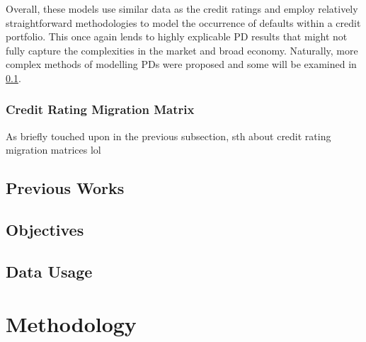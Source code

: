 \documentclass[10pt]{article}
\begin{document}
\begin{multicols*}{2}
Overall, these models use similar data as the credit ratings and employ relatively straightforward methodologies to model the occurrence of defaults within a credit portfolio. This once again lends to highly explicable PD results that might not fully capture the complexities in the market and broad economy.
Naturally, more complex methods of modelling PDs were proposed and some will be examined in \ref{lit-review}.

\subsubsection{Credit Rating Migration Matrix}\label{CRMM}

As briefly touched upon in the previous subsection, sth about credit rating migration matrices lol

\subsection{Previous Works}\label{lit-review}

\subsection{Objectives}\label{objectives}

\subsection{Data Usage}\label{data}

\section{Methodology}\label{methodology}

%
%
%	

\end{multicols*}

\clearpage


	
\end{document}
